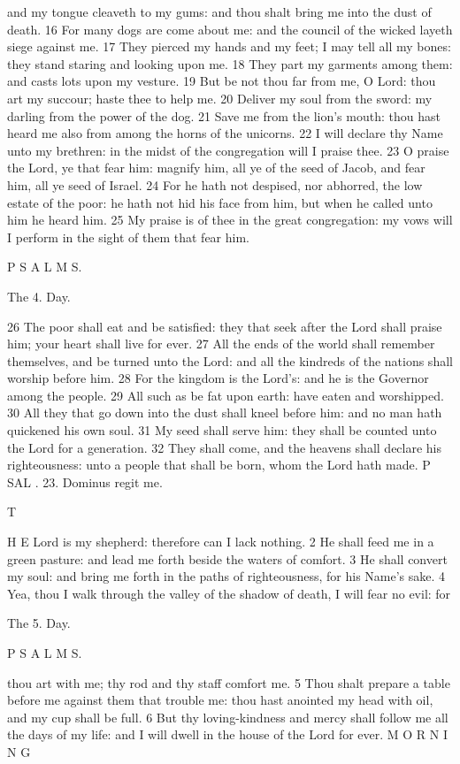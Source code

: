 and my tongue cleaveth to my gums: and thou shalt bring me into the dust of death. 16 For many dogs are come about me: and the council of the wicked layeth siege against me. 17 They pierced my hands and my feet; I may tell all my bones: they stand staring and looking upon me. 18 They part my garments among them: and casts lots upon my vesture. 19 But be not thou far from me, O Lord: thou art my succour; haste thee to help me. 20 Deliver my soul from the sword: my darling from the power of the dog. 21 Save me from the lion’s mouth: thou hast heard me also from among the horns of the unicorns. 22 I will declare thy Name unto my brethren: in the midst of the congregation will I praise thee. 23 O praise the Lord, ye that fear him: magnify him, all ye of the seed of Jacob, and fear him, all ye seed of Israel. 24 For he hath not despised, nor abhorred, the low estate of the poor: he hath not hid his face from him, but when he called unto him he heard him. 25 My praise is of thee in the great congregation: my vows will I perform in the sight of them that fear him.

P S A L M S.

The 4. Day.

26 The poor shall eat and be satisfied: they that seek after the Lord shall praise him; your heart shall live for ever. 27 All the ends of the world shall remember themselves, and be turned unto the Lord: and all the kindreds of the nations shall worship before him. 28 For the kingdom is the Lord’s: and he is the Governor among the people. 29 All such as be fat upon earth: have eaten and worshipped. 30 All they that go down into the dust shall kneel before him: and no man hath quickened his own soul. 31 My seed shall serve him: they shall be counted unto the Lord for a generation. 32 They shall come, and the heavens shall declare his righteousness: unto a people that shall be born, whom the Lord hath made. P SAL . 23. Dominus regit me.

T

H E Lord is my shepherd: therefore can I lack nothing. 2 He shall feed me in a green pasture: and lead me forth beside the waters of comfort. 3 He shall convert my soul: and bring me forth in the paths of righteousness, for his Name’s sake. 4 Yea, thou I walk through the valley of the shadow of death, I will fear no evil: for

The 5. Day.

P S A L M S.

thou art with me; thy rod and thy staff comfort me. 5 Thou shalt prepare a table before me against them that trouble me: thou hast anointed my head with oil, and my cup shall be full. 6 But thy loving-kindness and mercy shall follow me all the days of my life: and I will dwell in the house of the Lord for ever. M O R N I N G

